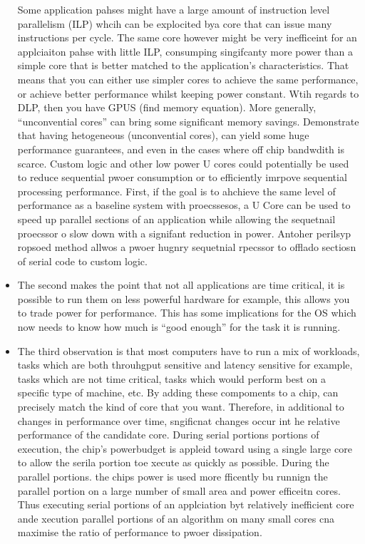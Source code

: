 \begin{itemize}
Some application pahses might have a large amount of instruction level parallelism (ILP) whcih can be explocited bya core that can issue many instructions per cycle. The same core however might be very inefficeint for an applciaiton pahse with little ILP, consumping singifcanty more power than a simple core that is better matched to the application's characteristics. 
That means that you can either use simpler
cores to achieve the same performance, or achieve better performance whilst
keeping power constant. Wtih regards to DLP, then you have GPUS
(find memory equation). More generally, ``unconvential cores'' can
bring some significant memory savings. Demonstrate that having hetogeneous
(unconvential cores), can yield some huge performance guarantees, and 
even in the cases where off chip bandwdith is scarce. 
Custom logic and other low power U cores could potentially be used to
reduce sequential pwoer consumption or to efficiently 
imrpove sequential processing performance. First, if the goal is to ahchieve the same level of performance as a baseline system with proecssesos, a U Core can be used to speed up parallel sections of an application while allowing the sequetnail proecssor o slow down with a signifant reduction in power. Antoher perilsyp ropsoed method allwos a pwoer hugnry sequetnial rpecssor to offlado sectiosn of serial code to custom logic. 
\item The second makes the point that not all applications
are time critical, it is possible to run them on 
less powerful hardware for example, this allows you to trade
power for performance. This has some implications for the OS
which now needs to know how much is ``good enough'' for the 
task it is running. 
\item The third observation is that most computers have to run 
a mix of workloads, tasks which are both throuhgput sensitive
and latency sensitive for example, tasks which are not time critical,
tasks which would perform best on a specific type of machine, etc. 
By adding these compoments to a chip, can precisely match the kind of 
core that you want. 
Therefore, in additional to changes in performance over time, sngificnat changes occur int he relative performance of the candidate core.  During serial portions  portions of execution, the chip's powerbudget is appleid toward using a single large core to allow the serila portion toe xecute as quickly as possible. 
During the parallel portions. the chips power is used more fficently bu runnign the parallel portion on a large number of small area and power efficeitn cores. Thus executing serial portions of an applciation byt relatively inefficient core ande xecution parallel portions of an algorithm on many small cores cna maximise the ratio 
of performance to pwoer dissipation. 


\end{itemize}
